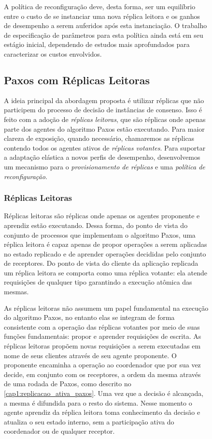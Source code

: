 \begin{figure}[ht]
A política de reconfiguração deve, desta forma, ser um equilíbrio entre o custo de se
instanciar uma nova réplica leitora e os ganhos de desempenho a serem auferidos após esta
instanciação. O trabalho de especificação de parâmetros para esta política ainda está em
seu estágio inicial, dependendo de estudos mais aprofundados para caracterizar os custos
envolvidos.

\subsection{Paxos com Réplicas Leitoras}\label{sec:replicas_leitoras}

A ideia principal da abordagem proposta é utilizar réplicas que não participem do processo
de decisão de instâncias de consenso. Isso é feito com a adoção de \emph{réplicas
leitoras}, que são réplicas onde apenas parte dos agentes do algoritmo Paxos estão
executando. Para maior clareza de exposição, quando necessário, chamaremos as réplicas
contendo todos os agentes ativos de \emph{réplicas votantes}. Para suportar a adaptação
elástica a novos perfis de desempenho, desenvolvemos um mecanismo para o
\emph{provisionamento de réplicas} e uma \emph{política de reconfiguração}.

\subsubsection{Réplicas Leitoras}

Réplicas leitoras são réplicas onde apenas os agentes proponente e aprendiz estão
executando. Dessa forma, do ponto de vista do conjunto de processos que implementam o
algoritmo Paxos, uma réplica leitora é capaz apenas de propor operações a serem aplicadas
no estado replicado e de aprender operações decididas pelo conjunto de receptores. Do
ponto de vista do cliente da aplicação replicada um réplica leitora se comporta como uma
réplica votante: ela atende requisições de qualquer tipo garantindo a execução atômica das
mesmas.

As réplicas leitoras não assumem um papel fundamental na execução do algoritmo Paxos, no
entanto elas se integram de forma consistente com a operação das réplicas votantes por
meio de suas funções fundamentais: propor e aprender requisições de escrita. As réplicas
leitoras propõem novas requisições a serem executadas em nome de seus clientes através de
seu agente proponente. O proponente encaminha a operação ao coordenador que por sua vez
decide, em conjunto com os receptores, a ordem da mesma através de uma rodada de Paxos,
como descrito no \autoref{cap1:replicacao_ativa_paxos}. Uma vez que a decisão é alcançada,
a mesma é difundida para o resto do sistema. Nesse momento o agente aprendiz da réplica
leitora toma conhecimento da decisão e atualiza o seu estado interno, sem a participação
ativa do coordenador ou de qualquer receptor.


\end{figure}
